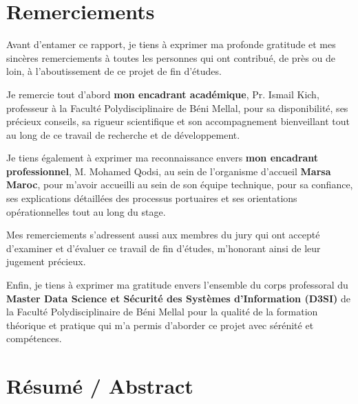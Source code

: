 \documentclass[12pt,a4paper]{article}
\begin{document}
\section*{Remerciements}

Avant d'entamer ce rapport, je tiens à exprimer ma profonde gratitude et mes sincères remerciements à toutes les personnes qui ont contribué, de près ou de loin, à l'aboutissement de ce projet de fin d'études.

Je remercie tout d'abord \textbf{mon encadrant académique}, Pr. Ismail Kich, professeur à la Faculté Polydisciplinaire de Béni Mellal, pour sa disponibilité, ses précieux conseils, sa rigueur scientifique et son accompagnement bienveillant tout au long de ce travail de recherche et de développement.

Je tiens également à exprimer ma reconnaissance envers \textbf{mon encadrant professionnel}, M. Mohamed Qodsi, au sein de l'organisme d'accueil \textbf{Marsa Maroc}, pour m'avoir accueilli au sein de son équipe technique, pour sa confiance, ses explications détaillées des processus portuaires et ses orientations opérationnelles tout au long du stage.

Mes remerciements s'adressent aussi aux membres du jury qui ont accepté d'examiner et d'évaluer ce travail de fin d'études, m'honorant ainsi de leur jugement précieux.

Enfin, je tiens à exprimer ma gratitude envers l'ensemble du corps professoral du \textbf{Master Data Science et Sécurité des Systèmes d'Information (D3SI)} de la Faculté Polydisciplinaire de Béni Mellal pour la qualité de la formation théorique et pratique qui m'a permis d'aborder ce projet avec sérénité et compétences.

\clearpage
\section*{Résumé / Abstract}
\end{document}
